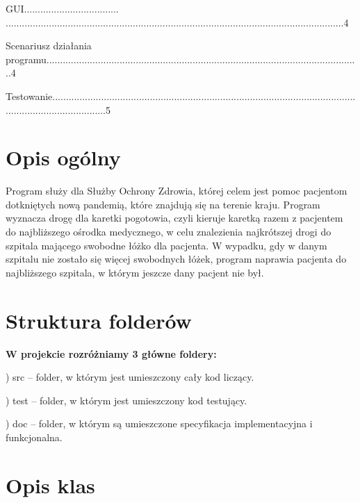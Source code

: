﻿\documentclass{article}
\begin{document}
\noindent GUI...................................    .............................................................................................................................4

\noindent Scenariusz dzia{\l}ania programu....................................................................................................................4

\noindent Testowanie.....................................................................................................................................................5

\eject

\noindent 
\section{Opis og\'{o}lny}

\noindent Program s{\l}u\.{z}y dla S{\l}u\.{z}by Ochrony Zdrowia, kt\'{o}rej celem jest pomoc pacjentom dotkni\k{e}tych now\k{a} pandemi\k{a}, kt\'{o}re znajduj\k{a} si\k{e} na terenie kraju. Program wyznacza drog\k{e} dla karetki pogotowia, czyli kieruje karetk\k{a} razem z pacjentem do najbli\.{z}szego o\'{s}rodka medycznego, w celu znalezienia najkr\'{o}tszej drogi do szpitala maj\k{a}cego swobodne {\l}\'{o}\.{z}ko dla pacjenta. W wypadku, gdy w danym szpitalu nie zosta{\l}o si\k{e} wi\k{e}cej swobodnych {\l}\'{o}\.{z}ek, program naprawia pacjenta do najbli\.{z}szego szpitala, w kt\'{o}rym jeszcze dany pacjent nie by{\l}.

\noindent 
\section{Struktura folder\'{o}w}

\noindent \textbf{W projekcie rozr\'{o}\.{z}niamy 3 g{\l}\'{o}wne foldery:}

\noindent {}

) src -- folder, w kt\'{o}rym jest umieszczony ca{\l}y kod licz\k{a}cy.

) test -- folder, w kt\'{o}rym jest umieszczony kod testuj\k{a}cy.

) doc -- folder, w kt\'{o}rym s\k{a} umieszczone specyfikacja implementacyjna i funkcjonalna.

\noindent 
\section{Opis klas}
\end{document}
